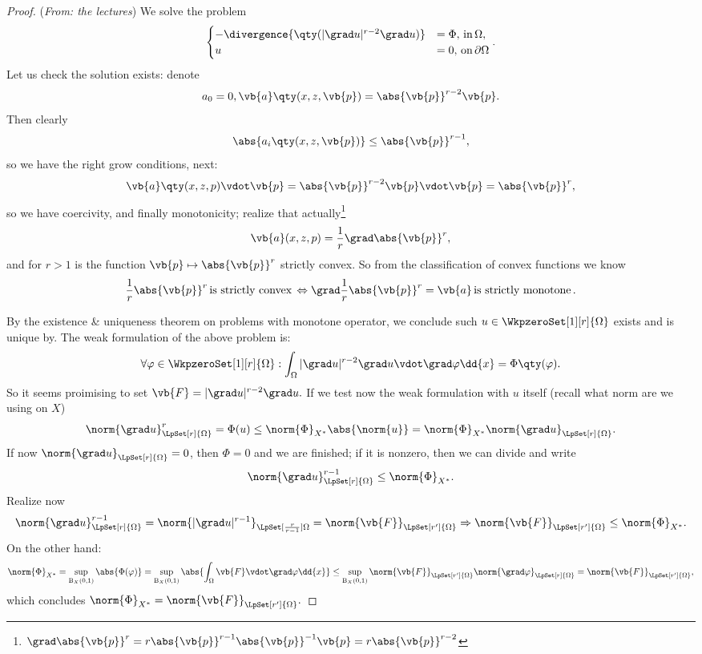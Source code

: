 \begin{proof}(\textit{From: the lectures})
	We solve the problem
	\begin{equation}
		\begin{cases}
			- \divergence{\qty(|\grad u|^{r-2}\grad u)} &= \Phi,  \, \text{in} \, \Omega, \\
			u &= 0,  \, \text{on} \, \partial \Omega
		\end{cases}.
	\end{equation}
	Let us check the solution exists: denote
	\[
		a_0 =0, \vb{a}\qty(x,z,\vb{p}) = \abs{\vb{p}}^{r-2}\vb{p}.
	\]
	Then clearly
	\[
		\abs{a_i\qty(x, z, \vb{p})} \leq \abs{\vb{p}}^{r-1},
	\]
	so we have the right grow conditions, next:
	\[
		\vb{a}\qty(x,z,p) \vdot \vb{p} = \abs{\vb{p}}^{r-2} \vb{p} \vdot \vb{p} = \abs{\vb{p}}^r,
	\]
	so we have coercivity, and finally monotonicity; realize that actually\footnote{$\grad \abs{\vb{p}}^r = r \abs{\vb{p}}^{r-1} \abs{\vb{p}}^{-1} \vb{p} = r \abs{\vb{p}}^{r-2}$}
	\[
		\vb{a}(x,z,p) = \frac{1}{r} \grad \abs{\vb{p}}^r,
	\]
and for $r>1$ is the function $\vb{p} \mapsto \abs{\vb{p}}^r$ strictly convex. So from the classification of convex functions we know
\[
	\frac{1}{r}\abs{\vb{p}}^r \, \text{is strictly convex} \, \Leftrightarrow \grad \frac{1}{r} \abs{\vb{p}}^r = \vb{a} \, \text{is strictly monotone} \,.
\]

By the existence \& uniqueness theorem on problems with monotone operator, we conclude such $u \in \WkpzeroSet[1][r]{\Omega}$ exists and is unique by. The weak formulation of the above problem is:
	\[
		\forall \varphi \in \WkpzeroSet[1][r]{\Omega}: \int_{\Omega}|\grad u|^{r-2} \grad u \vdot \grad \varphi \dd{x} = \Phi\qty(\varphi).
	\]
	So it seems proimising to set $\vb{F} = |\grad u|^{r-2} \grad u.$ If we test now the weak formulation with $u$ itself (recall what norm are we using on $X$)
	\[
		\norm{\grad u}_{\LpSet[r]{\Omega}}^r = \Phi(u) \leq \norm{\Phi}_{X^{*}} \abs{\norm{u}} = \norm{\Phi}_{X^{*}} \norm{\grad u}_{\LpSet[r]{\Omega}}.
	\]
	If now $\norm{\grad u}_{\LpSet[r]{\Omega}} = 0$, then $\Phi = 0$ and we are finished; if it is nonzero, then we can divide and write
	\[
		\norm{\grad u}_{\LpSet[r]{\Omega}}^{r-1} \leq \norm{\Phi}_{X^{*}}.
	\]
	Realize now
	\[
		\norm{\grad u}_{\LpSet[r]{\Omega}}^{r-1} = \norm{| \grad u|^{r-1}}_{\LpSet[\frac{r}{r-1}]{\Omega}} = \norm{\vb{F}}_{\LpSet[r']{\Omega}} \Rightarrow \norm{\vb{F}}_{\LpSet[r']{\Omega}} \leq \norm{\Phi}_{X^{*}}.
	\]
	On the other hand:
	\[
		\norm{\Phi}_{X^{*}} = \sup_{\text{B}_{X}(0,1)} \abs{\Phi(\varphi)} = \sup_{\text{B}_{X}(0,1)} \abs{\int_{\Omega}\vb{F} \vdot \grad \varphi \dd{x}} \leq \sup_{\text{B}_{X}(0,1)} \norm{\vb{F}}_{\LpSet[r']{\Omega}} \norm{\grad \varphi}_{\LpSet[r]{\Omega}} = \norm{\vb{F}}_{\LpSet[r']{\Omega}},
	\]
	which concludes $\norm{\Phi}_{X^{*}} = \norm{\vb{F}}_{\LpSet[r']{\Omega}}.$
\end{proof}




